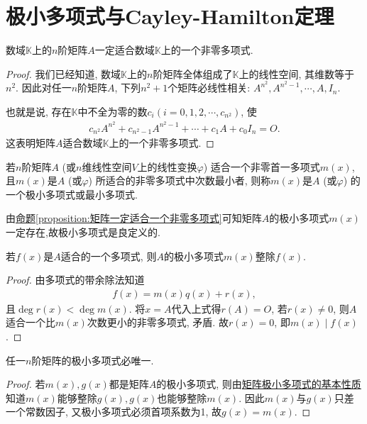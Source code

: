\documentclass[lang=cn,newtx,10pt,scheme=chinese]{elegantbook}
\begin{document}
\section{极小多项式与Cayley-Hamilton定理}

\begin{proposition}\label{proposition:矩阵一定适合一个非零多项式}
数域$\mathbb{K}$上的$n$阶矩阵$A$一定适合数域$\mathbb{K}$上的一个非零多项式.
\end{proposition}
\begin{proof}
我们已经知道, 数域$\mathbb{K}$上的$n$阶矩阵全体组成了$\mathbb{K}$上的线性空间, 其维数等于$n^2$. 因此对任一$n$阶矩阵$A$, 下列$n^2 + 1$个矩阵必线性相关:
$A^{n^2}, A^{n^2-1}, \cdots, A, I_n$.

也就是说, 存在$\mathbb{K}$中不全为零的数$c_i (i = 0, 1, 2, \cdots, c_{n^2})$, 使
\begin{align*}
c_{n^2}A^{n^2} + c_{n^2-1}A^{n^2-1} + \cdots + c_1A + c_0I_n = O.
\end{align*}
这表明矩阵$A$适合数域$\mathbb{K}$上的一个非零多项式.
\end{proof}

\begin{definition}[矩阵的极小多项式]
若$n$阶矩阵$A$ (或$n$维线性空间$V$上的线性变换$\varphi$) 适合一个非零首一多项式$m(x)$, 且$m(x)$是$A$ (或$\varphi$) 所适合的非零多项式中次数最小者, 则称$m(x)$是$A$ (或$\varphi$) 的一个极小多项式或最小多项式.
\end{definition}
\begin{remark}
由\hyperref[proposition:矩阵一定适合一个非零多项式]{命题\ref{proposition:矩阵一定适合一个非零多项式}}可知矩阵$A$的极小多项式$m(x)$一定存在,故极小多项式是良定义的.
\end{remark}

\begin{lemma}[矩阵极小多项式的基本性质]\label{lemma:矩阵极小多项式的基本性质}
若$f(x)$是$A$适合的一个多项式, 则$A$的极小多项式$m(x)$整除$f(x)$.
\end{lemma}
\begin{proof}
由多项式的带余除法知道
\begin{align*}
f(x) = m(x)q(x) + r(x),
\end{align*}
且$\deg r(x) < \deg m(x)$. 将$x = A$代入上式得$r(A) = O$, 若$r(x) \neq 0$, 则$A$适合一个比$m(x)$次数更小的非零多项式, 矛盾. 故$r(x) = 0$, 即$m(x) \mid f(x)$.
\end{proof}

\begin{proposition}[矩阵的极小多项式必唯一]\label{proposition:矩阵的极小多项式必唯一}
任一$n$阶矩阵的极小多项式必唯一.
\end{proposition}
\begin{proof}
若$m(x), g(x)$都是矩阵$A$的极小多项式, 则由\hyperref[lemma:矩阵极小多项式的基本性质]{矩阵极小多项式的基本性质}知道$m(x)$能够整除$g(x), g(x)$也能够整除$m(x)$. 因此$m(x)$与$g(x)$只差一个常数因子, 又极小多项式必须首项系数为1, 故$g(x) = m(x)$.
\end{proof}
\end{document}
